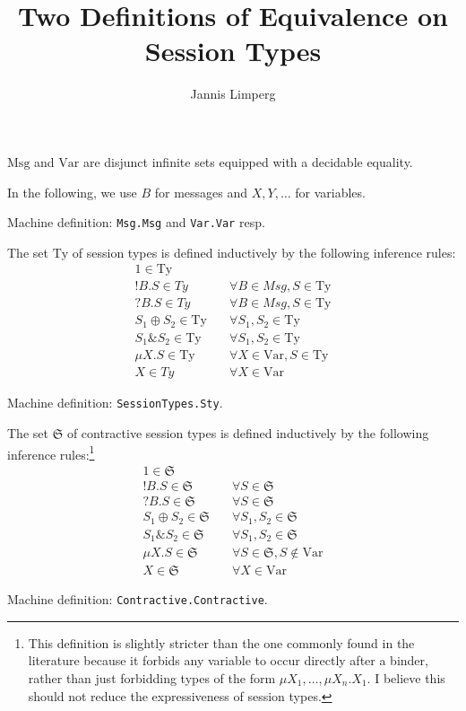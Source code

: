 \documentclass{llncs}
\newcommand*{\Msg}{\mathrm{Msg}}
\newcommand*{\Var}{\mathrm{Var}}
\newcommand*{\Ty}{\mathrm{Ty}}
\renewcommand*{\S}{\mathfrak{S}}
\newcommand*{\send}{\mathord{!}}
\newcommand*{\recv}{\mathord{?}}
\newcommand*{\echoice}{\oplus}
\newcommand*{\ichoice}{\mathop{\&}}
\renewcommand*{\|}{\;|\;}
\newcommand*{\machdef}[1]{Machine definition: #1}
\newcommand*{\machdefc}[1]{Machine definition: \code{#1}.}
\newcommand*{\code}[1]{\texttt{#1}}
\begin{document}
\title{Two Definitions of Equivalence on Session Types}
\author{Jannis Limperg}
\maketitle

\begin{definition}
  $\Msg$ and $\Var$ are disjunct infinite sets equipped with a decidable
  equality.

  In the following, we use $B$ for messages and $X, Y, \dots$ for variables.

  \machdef{\code{Msg.Msg} and \code{Var.Var} resp.}
\end{definition}


\begin{definition}
  The set $\Ty$ of session types is defined inductively by the following
  inference rules:
  \label{def:session_types}
  \begin{align*}
    1 \in \Ty \\
    \send B.S \in Ty &\quad \forall B \in Msg, S \in \Ty \\
    \recv B.S \in Ty &\quad \forall B \in Msg, S \in \Ty \\
    S_1 \echoice S_2 \in \Ty &\quad \forall S_1, S_2 \in \Ty \\
    S_1 \ichoice S_2 \in \Ty &\quad \forall S_1, S_2 \in \Ty \\
    \mu X.S \in \Ty &\quad \forall X \in \Var, S \in \Ty \\
    X \in Ty &\quad \forall X \in \Var
  \end{align*}

  \machdefc{SessionTypes.Sty}
\end{definition}


\begin{definition}[Contractivity]
  \label{def:contractivity}
  The set $\S$ of contractive session types is defined inductively by the
  following inference rules:\footnote{This definition is slightly stricter
  than the one commonly found in the literature because it forbids any
  variable to occur directly after a binder, rather than just forbidding
  types of the form $\mu X_1, \dots, \mu X_n.X_1$. I believe this should not
  reduce the expressiveness of session types.}
  \begin{align*}
    1 \in \S &\\
    \send B.S \in \S &\quad \forall S \in \S \\
    \recv B.S \in \S &\quad \forall S \in \S \\
    S_1 \echoice S_2 \in \S &\quad \forall S_1, S_2 \in \S \\
    S_1 \ichoice S_2 \in \S &\quad \forall S_1, S_2 \in \S \\
    \mu X.S \in \S &\quad \forall S \in \S, S \notin \Var \\
    X \in \S &\quad \forall X \in \Var
  \end{align*}

  \machdefc{Contractive.Contractive}
\end{definition}
\end{document}
